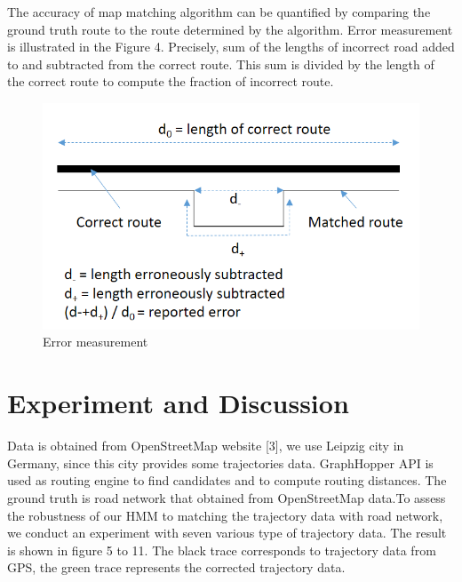 \documentclass[a4paper]{article}
\begin{document}
The accuracy of map matching algorithm can be quantified by comparing the ground truth route to the route determined by the algorithm. Error measurement is illustrated in the Figure 4. Precisely, sum of the lengths of incorrect road added to and subtracted from the correct route. This sum is divided by the length of the correct route to compute the fraction of incorrect route. 

\begin{figure}
\centering
\includegraphics[width=1.0\textwidth]{fig4.png}
\caption{\label{fig:data} Error measurement}
\end{figure}

\section{Experiment and Discussion}
\label{sec:experiment}

Data is obtained from OpenStreetMap website [3], we use Leipzig city in Germany, since this city provides some trajectories data. GraphHopper API is used as routing engine to find candidates and to compute routing distances. The ground truth is road network that obtained from OpenStreetMap data.To assess the robustness of our HMM to matching the trajectory data with road network, we conduct an experiment with seven various type of trajectory data. The result is shown in figure 5 to 11. The black trace corresponds to trajectory data from GPS, the green trace represents the corrected trajectory data.
\end{document}
